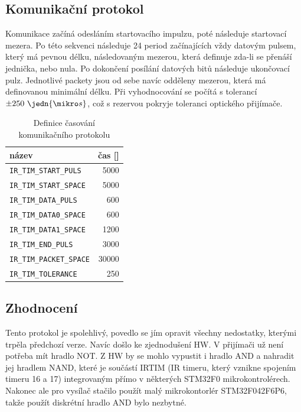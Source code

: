 \subsection{Komunikační protokol}
Komunikace začíná odesláním startovacího impulzu, poté následuje startovací mezera. Po této sekvenci následuje 24 period začínajících vždy datovým pulsem, který má pevnou délku, následovaným mezerou, která definuje zda-li se přenáší jednička, nebo nula. Po dokončení posílání datových bitů následuje ukončovací pulz. Jednotlivé packety jsou od sebe navíc odděleny mezerou, která má definovanou minimální délku. Při vyhodnocování se počítá s tolerancí $\pm250~\jedn{\mikro s}$, což s rezervou pokryje toleranci optického přijímače.

\begin{table}[H]
  \caption{Definice časování komunikačního protokolu}
  \begin{center}
  	\small
	  \begin{tabular}{|l|r|}
	    \hline
	    \textbf{název} & \textbf{čas [\jedn{\mikro s}]} \\\hline\hline
	    \texttt{IR\_TIM\_START\_PULS}       &  5000     \\\hline
	    \texttt{IR\_TIM\_START\_SPACE}      &  5000     \\\hline
	    \texttt{IR\_TIM\_DATA\_PULS}        &   600     \\\hline
	    \texttt{IR\_TIM\_DATA0\_SPACE}      &   600     \\\hline
        \texttt{IR\_TIM\_DATA1\_SPACE}      &  1200     \\\hline
        \texttt{IR\_TIM\_END\_PULS}         &  3000     \\\hline
        \texttt{IR\_TIM\_PACKET\_SPACE}     & 30000     \\\hline
        \texttt{IR\_TIM\_TOLERANCE}         &   250     \\\hline
	  \end{tabular}
  \end{center}
\end{table}



\subsection{Zhodnocení}
Tento protokol je spolehlivý, povedlo se jím opravit všechny nedostatky, kterými trpěla předchozí verze. Navíc došlo ke zjednodušení HW. V přijímači už není potřeba mít hradlo NOT. Z HW by se mohlo vypustit i hradlo AND a nahradit jej hradlem NAND, které je součástí IRTIM (IR timeru, který vznikne spojením timeru 16 a 17) integrovaným přímo v některých STM32F0 mikrokontrolérech. Nakonec ale pro vysílač stačilo použít malý mikrokontorlér STM32F042F6P6, takže použít diskrétní hradlo AND bylo nezbytné.

